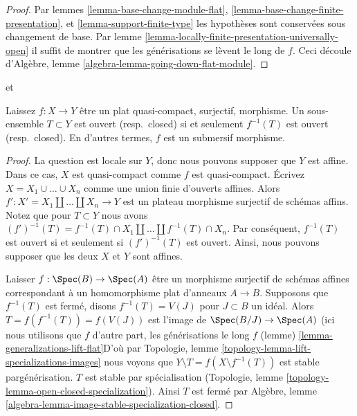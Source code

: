\begin{proof}
Par lemmes \ref{lemma-base-change-module-flat}, \ref{lemma-base-change-finite-presentation}, et \ref{lemma-support-finite-type} les hypothèses sont conservées sous changement de base. Par lemme \ref{lemma-locally-finite-presentation-universally-open} il suffit de montrer que les générisations se lèvent le long de $f$. Ceci découle d'Algèbre, lemme \ref{algebra-lemma-going-down-flat-module}.
\end{proof}

\begin{lemma}

\label{lemma-fpqc-quotient-topology}

\begin{reference}
\cite[Expose VIII, Corollaire 4.3]{SGA1} et \cite[IV, Corollaire 2.3.12]{EGA}
\end{reference}
Laissez $f : X \to Y$ être un plat quasi-compact, surjectif, morphisme. Un sous-ensemble $T \subset Y$ est ouvert (resp.\ closed) si et seulement $f^{-1}(T)$ est ouvert (resp.\ closed). En d'autres termes, $f$ est un submersif morphisme.
\end{lemma}

\begin{proof}
La question est locale sur $Y$, donc nous pouvons supposer que $Y$ est affine. Dans ce cas, $X$ est quasi-compact comme $f$ est quasi-compact. Écrivez $X = X_1 \cup \ldots \cup X_n$ comme une union finie d'ouverts affines. Alors $f' : X' = X_1 \amalg \ldots \amalg X_n \to Y$ est un plateau morphisme surjectif de schémas affins. Notez que pour $T \subset Y$ nous avons $(f')^{-1}(T) = f^{-1}(T) \cap X_1 \amalg \ldots \amalg f^{-1}(T) \cap X_n$. Par conséquent, $f^{-1}(T)$ est ouvert si et seulement si $(f')^{-1}(T)$ est ouvert. Ainsi, nous pouvons supposer que les deux $X$ et $Y$ sont affines.

\medskip\noindent

Laisser $f : \Spec(B) \to \Spec(A)$ être un morphisme surjectif de schémas affines correspondant à un homomorphisme plat d'anneaux $A \to B$. Supposons que $f^{-1}(T)$ est fermé, disons $f^{-1}(T) = V(J)$ pour $J \subset B$ un idéal. Alors
$T = f(f^{-1}(T)) = f(V(J))$ est l'image de $\Spec(B/J) \to \Spec(A)$
(ici nous utilisons que $f$ d'autre part, les générisations le long $f$ (lemme) \ref{lemma-generalizations-lift-flat}D'où par Topologie, lemme \ref{topology-lemma-lift-specializations-images}
nous voyons que $Y \setminus T = f(X \setminus f^{-1}(T))$ est stable pargénérisation. $T$ est stable par spécialisation (Topologie, lemme \ref{topology-lemma-open-closed-specialization}). Ainsi $T$ est fermé par Algèbre, lemme \ref{algebra-lemma-image-stable-specialization-closed}.

\end{proof}

